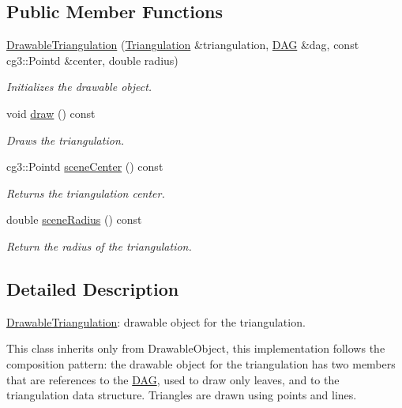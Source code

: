 \subsection*{Public Member Functions}
\begin{DoxyCompactItemize}
\item 
\hyperlink{classDrawableTriangulation_a7285109cc73a2d0a233cccd0cb9278a4}{Drawable\+Triangulation} (\hyperlink{classTriangulation}{Triangulation} \&triangulation, \hyperlink{classDAG}{D\+AG} \&dag, const cg3\+::\+Pointd \&center, double radius)
\begin{DoxyCompactList}\small\item\em Initializes the drawable object. \end{DoxyCompactList}\item 
void \hyperlink{classDrawableTriangulation_a364e9b612571481930770fdfa9d68148}{draw} () const
\begin{DoxyCompactList}\small\item\em Draws the triangulation. \end{DoxyCompactList}\item 
cg3\+::\+Pointd \hyperlink{classDrawableTriangulation_a3198ae77285c354fd020f5b18df718f5}{scene\+Center} () const
\begin{DoxyCompactList}\small\item\em Returns the triangulation center. \end{DoxyCompactList}\item 
double \hyperlink{classDrawableTriangulation_a0aee9121b146c327dbbd741c3dc58c0a}{scene\+Radius} () const
\begin{DoxyCompactList}\small\item\em Return the radius of the triangulation. \end{DoxyCompactList}\end{DoxyCompactItemize}


\subsection{Detailed Description}
\hyperlink{classDrawableTriangulation}{Drawable\+Triangulation}\+: drawable object for the triangulation. 

This class inherits only from Drawable\+Object, this implementation follows the composition pattern\+: the drawable object for the triangulation has two members that are references to the \hyperlink{classDAG}{D\+AG}, used to draw only leaves, and to the triangulation data structure. Triangles are drawn using points and lines. 

